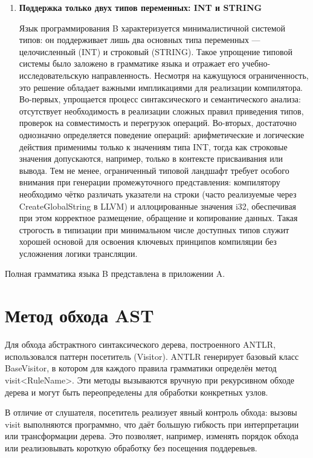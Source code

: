 \begin{enumerate}
	\item \textbf{Поддержка только двух типов переменных: INT и STRING}

	Язык программирования B характеризуется минималистичной системой типов: он поддерживает лишь два основных типа переменных — целочисленный (INT) и строковый (STRING). 
	Такое упрощение типовой системы было заложено в грамматике языка и отражает его учебно-исследовательскую направленность. 
	Несмотря на кажущуюся ограниченность, это решение обладает важными импликациями для реализации компилятора. 
	Во-первых, упрощается процесс синтаксического и семантического анализа: отсутствует необходимость в реализации сложных правил приведения типов, проверок на совместимость и перегрузок операций. 
	Во-вторых, достаточно однозначно определяется поведение операций: арифметические и логические действия применимы только к значениям типа INT, тогда как строковые значения допускаются, например, только в контексте присваивания или вывода. 
	Тем не менее, ограниченный типовой ландшафт требует особого внимания при генерации промежуточного представления: компилятору необходимо чётко различать указатели на строки (часто реализуемые через CreateGlobalString в LLVM) и аллоцированные значения i32, обеспечивая при этом корректное размещение, обращение и копирование данных. 
	Такая строгость в типизации при минимальном числе доступных типов служит хорошей основой для освоения ключевых принципов компиляции без усложнения логики трансляции.
\end{enumerate}

Полная грамматика языка B представлена в приложении A.

\section{Метод обхода AST}

Для обхода абстрактного синтаксического дерева, построенного ANTLR, использовался паттерн посетитель (Visitor). 
ANTLR генерирует базовый класс BaseVisitor, в котором для каждого правила грамматики определён метод visit<RuleName>. 
Эти методы вызываются вручную при рекурсивном обходе дерева и могут быть переопределены для обработки конкретных узлов.

В отличие от слушателя, посетитель реализует явный контроль обхода: вызовы visit выполняются программно, что даёт большую гибкость при интерпретации или трансформации дерева. Это позволяет, например, изменять порядок обхода или реализовывать короткую обработку без посещения поддеревьев.

